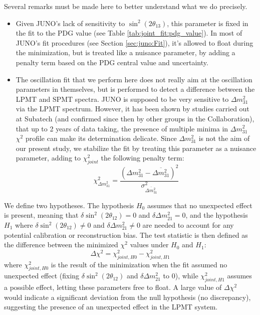 \documentclass[../main.tex]{subfiles}
\begin{document}
Several remarks must be made here to better understand what we do precisely.
\begin{itemize}
  \item Given JUNO's lack of sensitivity to $\sin^2(2\theta_{13})$, this parameter is fixed in the fit to the PDG value (see Table \ref{tab:joint_fit:pdg_value}). In most of JUNO's fit procedures (see Section \ref{sec:juno:Fit}), it's allowed to float during the minimization, but is treated like a nuisance parameter, by adding a penalty term based on the PDG central value and uncertainty.


 \item The oscillation fit that we perform here does not really aim at the oscillation parameters in themselves, but is performed to detect a difference between the LPMT and SPMT spectra. JUNO is supposed to be very sensitive to $\Delta m^2_{31}$ via the LPMT spectrum. However, it has been shown by studies carried out at Subatech (and confirmed since then by other groups in the Collaboration), that up to 2 years of data taking, the presence of multiple minima in $\Delta m^2_{31}$ $\chi^2$ profile can make its determination delicate. Since $\Delta m^2_{31}$ is not the aim of our present study, we stabilize the fit by treating this parameter as a nuisance parameter, adding to $\chi^2_{joint}$ the following penalty term:
    \begin{equation}
      \chi^2_{\Delta m^2_{31}} = \frac{(\Delta m^2_{31}-\overline{\Delta m^2_{31}})^2}{\sigma^2_{\overline{\Delta m^2_{31}}}}
    \end{equation}
\end{itemize}
\hfill


We define two hypotheses. The hypothesis $H_0$ assumes that no unexpected effect is present, meaning that $\delta \sin^2(2\theta_{12}) = 0$ and $\delta \Delta m^2_{21} = 0$, and the hypothesis $H_1$  where  $\delta \sin^2(2\theta_{12}) \neq 0$ and $\delta \Delta m^2_{21} \neq 0$ are needed to account for any potential calibration or reconstruction bias.
The test statistic is then defined as the difference between the minimized $\chi^2$ values under $H_0$ and $H_1$:
\begin{equation}
  \Delta \chi^2 = \chi^2_{joint,H0} - \chi^2_{joint, H1}
\end{equation}
where $\chi^2_{joint,H0}$ is the result of the minimization when the fit assumed no unexpected effect (fixing $\delta \sin^2(2\theta_{12})$ and $\delta \Delta m^2_{21}$ to 0), while $\chi^2_{joint, H1}$ assumes a possible effect, letting these parameters free to float. A large value of $\Delta \chi^2$ would indicate a significant deviation from the null hypothesis (no discrepancy), suggesting the presence of an unexpected effect in the LPMT system.
\end{document}

